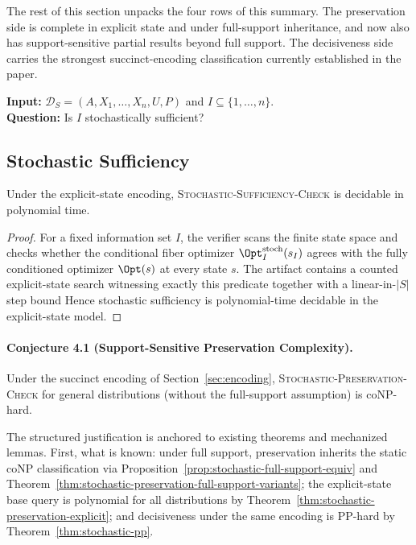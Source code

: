 The rest of this section unpacks the four rows of this summary. The preservation side is complete in explicit state and under full-support inheritance, and now also has support-sensitive partial results beyond full support. The decisiveness side carries the strongest succinct-encoding classification currently established in the paper.

\begin{problem}\label{prob:stochastic-sufficiency}
\textbf{Input:} $\mathcal{D}_S=(A,X_1,\ldots,X_n,U,P)$ and $I\subseteq\{1,\ldots,n\}$. \\
\textbf{Question:} Is $I$ stochastically sufficient?
\end{problem}

\subsection{Stochastic Sufficiency}

\begin{theorem}\label{thm:stochastic-preservation-explicit}
Under the explicit-state encoding, \textsc{Stochastic-Sufficiency-Check} is decidable in polynomial time.
\end{theorem}


\begin{proof}
For a fixed information set $I$, the verifier scans the finite state space and checks whether the conditional fiber optimizer $\Opt^{\mathrm{stoch}}_I(s_I)$ agrees with the fully conditioned optimizer $\Opt(s)$ at every state $s$. The artifact contains a counted explicit-state search witnessing exactly this predicate together with a linear-in-$|S|$ step bound  Hence stochastic sufficiency is polynomial-time decidable in the explicit-state model.
\end{proof}

\paragraph{Conjecture 4.1 (Support-Sensitive Preservation Complexity).}
Under the succinct encoding of Section~\ref{sec:encoding}, \textsc{Stochastic-Preservation-Check}
for general distributions (without the full-support assumption) is coNP-hard.

The structured justification is anchored to existing theorems and mechanized lemmas.
First, what is known: under full support, preservation inherits the static coNP classification
via Proposition~\ref{prop:stochastic-full-support-equiv} and
Theorem~\ref{thm:stochastic-preservation-full-support-variants}; the explicit-state base
query is polynomial for all distributions by Theorem~\ref{thm:stochastic-preservation-explicit};
and decisiveness under the same encoding is PP-hard by Theorem~\ref{thm:stochastic-pp}.

